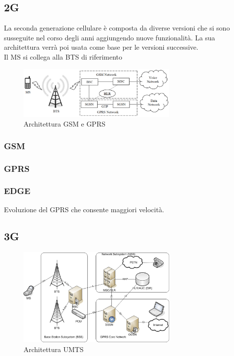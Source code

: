\subsection{2G}
La seconda generazione cellulare è composta da diverse versioni che si sono susseguite nel corso degli anni aggiungendo nuove 
funzionalità.
La sua architettura verrà poi usata come base per le versioni successive.\\
Il MS si collega alla BTS di riferimento 
\begin{figure}[ht]
    \centering
    \includegraphics[width=0.7\textwidth]{images/2g-gsm-gprs.png}
    \caption{Architettura GSM e GPRS}
\end{figure}
\subsubsection{GSM}


\subsubsection{GPRS}


\subsubsection{EDGE}
Evoluzione del GPRS che consente maggiori velocità.

\subsection{3G}
\begin{figure}[ht]
    \centering
    \includegraphics[width=0.7\textwidth]{images/3g-umts.png}
    \caption{Architettura UMTS}
\end{figure}

